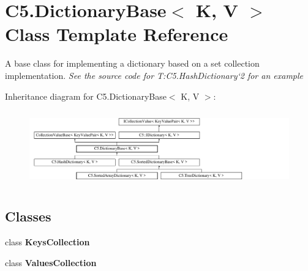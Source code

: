 \hypertarget{class_c5_1_1_dictionary_base}{}\section{C5.\+Dictionary\+Base$<$ K, V $>$ Class Template Reference}
\label{class_c5_1_1_dictionary_base}


A base class for implementing a dictionary based on a set collection implementation. {\itshape See the source code for T\+:\+C5.\+Hash\+Dictionary`2 for an example}  


Inheritance diagram for C5.\+Dictionary\+Base$<$ K, V $>$\+:\begin{figure}[H]
\begin{center}
\leavevmode
\includegraphics[height=3.286385cm]{class_c5_1_1_dictionary_base}
\end{center}
\end{figure}
\subsection*{Classes}
\begin{DoxyCompactItemize}
\item 
class {\bfseries Keys\+Collection}
\item 
class {\bfseries Values\+Collection}
\end{DoxyCompactItemize}
